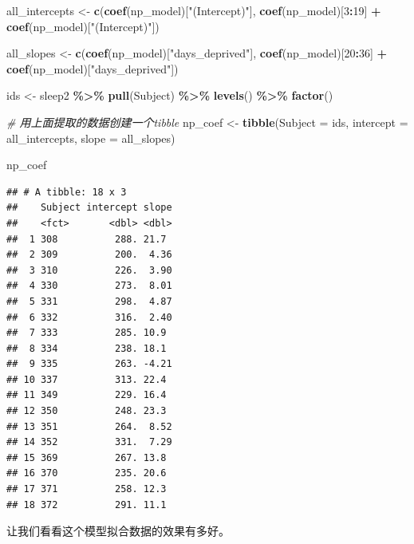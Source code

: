 \documentclass[
]{book}
\newenvironment{Shaded}{\begin{snugshade}}{\end{snugshade}}
\newcommand{\AttributeTok}[1]{\textcolor[rgb]{0.13,0.29,0.53}{#1}}
\newcommand{\CommentTok}[1]{\textcolor[rgb]{0.56,0.35,0.01}{\textit{#1}}}
\newcommand{\DecValTok}[1]{\textcolor[rgb]{0.00,0.00,0.81}{#1}}
\newcommand{\FunctionTok}[1]{\textcolor[rgb]{0.13,0.29,0.53}{\textbf{#1}}}
\newcommand{\NormalTok}[1]{#1}
\newcommand{\OtherTok}[1]{\textcolor[rgb]{0.56,0.35,0.01}{#1}}
\newcommand{\SpecialCharTok}[1]{\textcolor[rgb]{0.81,0.36,0.00}{\textbf{#1}}}
\newcommand{\StringTok}[1]{\textcolor[rgb]{0.31,0.60,0.02}{#1}}
\begin{document}
\begin{Shaded}
\begin{Highlighting}[]
\NormalTok{all\_intercepts }\OtherTok{\textless{}{-}} \FunctionTok{c}\NormalTok{(}\FunctionTok{coef}\NormalTok{(np\_model)[}\StringTok{"(Intercept)"}\NormalTok{],}
                    \FunctionTok{coef}\NormalTok{(np\_model)[}\DecValTok{3}\SpecialCharTok{:}\DecValTok{19}\NormalTok{] }\SpecialCharTok{+} \FunctionTok{coef}\NormalTok{(np\_model)[}\StringTok{"(Intercept)"}\NormalTok{])}

\NormalTok{all\_slopes  }\OtherTok{\textless{}{-}} \FunctionTok{c}\NormalTok{(}\FunctionTok{coef}\NormalTok{(np\_model)[}\StringTok{"days\_deprived"}\NormalTok{],}
                 \FunctionTok{coef}\NormalTok{(np\_model)[}\DecValTok{20}\SpecialCharTok{:}\DecValTok{36}\NormalTok{] }\SpecialCharTok{+} \FunctionTok{coef}\NormalTok{(np\_model)[}\StringTok{"days\_deprived"}\NormalTok{])}

\NormalTok{ids }\OtherTok{\textless{}{-}}\NormalTok{ sleep2 }\SpecialCharTok{\%\textgreater{}\%} \FunctionTok{pull}\NormalTok{(Subject) }\SpecialCharTok{\%\textgreater{}\%} \FunctionTok{levels}\NormalTok{() }\SpecialCharTok{\%\textgreater{}\%} \FunctionTok{factor}\NormalTok{()}

\CommentTok{\# 用上面提取的数据创建一个tibble}
\NormalTok{np\_coef }\OtherTok{\textless{}{-}} \FunctionTok{tibble}\NormalTok{(}\AttributeTok{Subject =}\NormalTok{ ids,}
                  \AttributeTok{intercept =}\NormalTok{ all\_intercepts,}
                  \AttributeTok{slope =}\NormalTok{ all\_slopes)}

\NormalTok{np\_coef}
\end{Highlighting}
\end{Shaded}

\begin{verbatim}
## # A tibble: 18 x 3
##    Subject intercept slope
##    <fct>       <dbl> <dbl>
##  1 308          288. 21.7 
##  2 309          200.  4.36
##  3 310          226.  3.90
##  4 330          273.  8.01
##  5 331          298.  4.87
##  6 332          316.  2.40
##  7 333          285. 10.9 
##  8 334          238. 18.1 
##  9 335          263. -4.21
## 10 337          313. 22.4 
## 11 349          229. 16.4 
## 12 350          248. 23.3 
## 13 351          264.  8.52
## 14 352          331.  7.29
## 15 369          267. 13.8 
## 16 370          235. 20.6 
## 17 371          258. 12.3 
## 18 372          291. 11.1
\end{verbatim}

让我们看看这个模型拟合数据的效果有多好。
\end{document}
